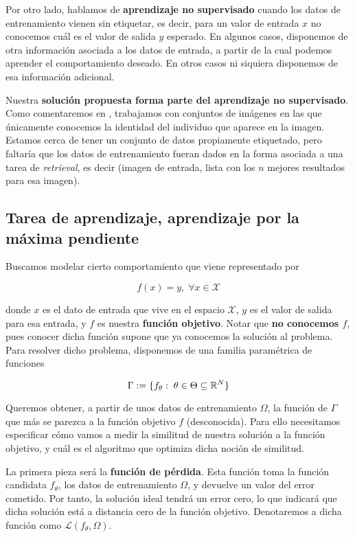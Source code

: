 Por otro lado, hablamos de \textbf{aprendizaje no supervisado} cuando los datos de entrenamiento vienen sin etiquetar, es decir, para un valor de entrada $x$ no conocemos cuál es el valor de salida $y$ esperado. En algunos casos, disponemos de otra información asociada a los datos de entrada, a partir de la cual podemos aprender el comportamiento deseado. En otros casos ni siquiera disponemos de esa información adicional.

Nuestra \textbf{solución propuesta forma parte del aprendizaje no supervisado}. Como comentaremos en , trabajamos con conjuntos de imágenes en las que únicamente conocemos la identidad del individuo que aparece en la imagen. Estamos cerca de tener un conjunto de datos propiamente etiquetado, pero faltaría que los datos de entrenamiento fueran dados en la forma asociada a una tarea de \textit{retrieval}, es decir (imagen de entrada, lista con los $n$ mejores resultados para esa imagen).

\subsection{Tarea de aprendizaje, aprendizaje por la máxima pendiente}

Buscamos modelar cierto comportamiento que viene representado por

\begin{equation}
    f(x) = y, \; \forall x \in \mathcal{X}
\end{equation}

donde $x$ es el dato de entrada que vive en el espacio $\mathcal{X}$, $y$ es el valor de salida para esa entrada, y $f$ es nuestra \textbf{función objetivo}. Notar que \textbf{no conocemos $f$}, pues conocer dicha función supone que ya conocemos la solución al problema. Para resolver dicho problema, disponemos de una familia paramétrica de funciones

\begin{equation}
    \Gamma := \{ f_{\theta}: \; \theta \in \Theta \subseteq \mathbb{R}^N  \}
\end{equation}

Queremos obtener, a partir de unos datos de entrenamiento $\Omega$, la función de $\Gamma$ que más se parezca a la función objetivo $f$ (desconocida). Para ello necesitamos especificar cómo vamos a medir la similitud de nuestra solución a la función objetivo, y cuál es el algoritmo que optimiza dicha noción de similitud.

La primera pieza será la \textbf{función de pérdida}. Esta función toma la función candidata $f_{\theta}$, los datos de entrenamiento $\Omega$, y devuelve un valor del error cometido. Por tanto, la solución ideal tendrá un error cero, lo que indicará que dicha solución está a distancia cero de la función objetivo. Denotaremos a dicha función como $\mathcal{L}(f_\theta, \Omega)$.

